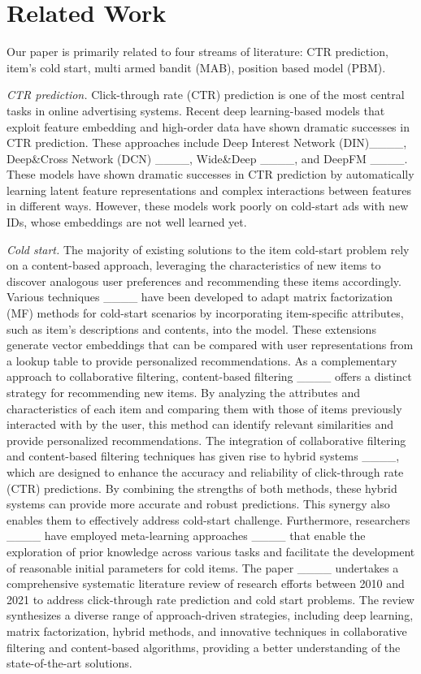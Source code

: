 \section{Related Work}
Our paper is primarily related to four streams of literature: CTR prediction, item's cold start, multi armed bandit (MAB), position based model (PBM).

\textit{CTR prediction.} Click-through rate (CTR) prediction is one of the most central tasks in online advertising systems. Recent deep learning-based models that exploit feature embedding and high-order data have shown dramatic successes in CTR prediction. These approaches include Deep Interest Network (DIN)____, Deep\&Cross Network  (DCN) ____, Wide\&Deep ____, and DeepFM ____. These models have shown dramatic successes in CTR prediction by automatically learning latent feature representations and complex interactions between features in different ways. However, these models work poorly on cold-start ads with new IDs, whose embeddings are not well learned yet.

\textit{Cold start.} The majority of existing solutions to the item cold-start problem rely on a content-based approach, leveraging the characteristics of new items to discover analogous user preferences and recommending these items accordingly. Various techniques ____ have been developed to adapt matrix factorization (MF) methods for cold-start scenarios by incorporating item-specific attributes, such as item's descriptions and contents, into the model. These extensions generate vector embeddings that can be compared with user representations from a lookup table to provide personalized recommendations. As a complementary approach to collaborative filtering, content-based filtering ____ offers a distinct strategy for recommending new items. By analyzing the attributes and characteristics of each item and comparing them with those of items previously interacted with by the user, this method can identify relevant similarities and provide personalized recommendations. The integration of collaborative filtering and content-based filtering techniques has given rise to hybrid systems ____, which are designed to enhance the accuracy and reliability of click-through rate (CTR) predictions. By combining the strengths of both methods, these hybrid systems can provide more accurate and robust predictions. This synergy also enables them to effectively address cold-start challenge. Furthermore, researchers  ____ have employed meta-learning approaches ____ that enable the exploration of prior knowledge across various tasks and facilitate the development of reasonable initial parameters for cold items. The paper ____ undertakes a comprehensive systematic literature review of research efforts between 2010 and 2021 to address click-through rate prediction and cold start problems. The review synthesizes a diverse range of approach-driven strategies, including deep learning, matrix factorization, hybrid methods, and innovative techniques in collaborative filtering and content-based algorithms, providing a better understanding of the state-of-the-art solutions.

